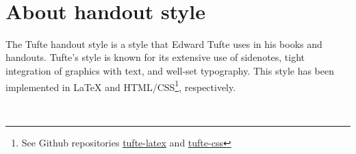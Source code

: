 \documentclass[]{tufte-handout}
\begin{document}
　

\hypertarget{about-handout-style}{%
\section{About handout style}\label{about-handout-style}}

The Tufte handout style is a style that Edward Tufte uses in his books
and handouts. Tufte's style is known for its extensive use of sidenotes,
tight integration of graphics with text, and well-set typography. This
style has been implemented in LaTeX and HTML/CSS\footnote{See Github
  repositories
  \href{https://github.com/tufte-latex/tufte-latex}{tufte-latex} and
  \href{https://github.com/edwardtufte/tufte-css}{tufte-css}},
respectively.

　


\end{document}
